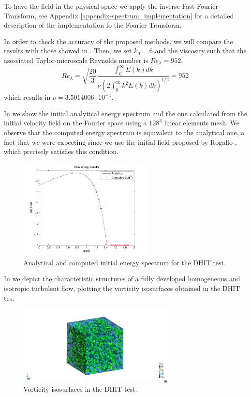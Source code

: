 To have the field  in the physical space we apply the inverse Fast Fourier Transform, see Appendix \ref{appendix-spectrum_implementation} for a detailed description of the implementation fo the Fourier Transform.

In order to check the accuracy of the proposed methods, we will compare the results with those showed in \cite{_selection_????}. Then, we set $k_0=6$ and the viscosity such that the asossiated Taylor-microscale Reynolds number is $Re_\lambda=952$,
$$Re_\lambda=\sqrt{\frac{20}{3}}\frac{\int_0^\infty E(k)dk}{\nu\left(2\int_0^\infty k^2E(k)dk\right)^{1/2}}=952\,$$
which results in $\nu=3.5014006\cdot 10^{-4}$.

In  we show the initial analytical energy spectrum and the one calculated from the initial velocity field on the Fourier space  using a $128^3$ linear elements mesh. We observe that the computed energy spectrum is equivalent to the analytical one, a fact that we were expecting since we use the initial field proposed by Rogallo \cite{rogallo_numerical_1981}, which precisely satisfies this condition.
\begin{figure}[h!]
	\centering	
	\includegraphics[width=0.6\textwidth]{Figures/Chapter3/DHIT_initial_energy}
	\caption{Analytical and computed initial energy spectrum for the DHIT test.}
	\label{fig-DHIT_initial_spectrum}
\end{figure}

In  we depict the characteristic structures of a fully developed homogeneous and isotropic turbulent flow, plotting the vorticity isosurfaces obtained in the DHIT tes.
\begin{figure}[h!]
	\centering	
	\includegraphics[trim=18cm 3.3cm 14cm 3.2cm,clip=true,width=0.7\textwidth]{Figures/Chapter3/DHIT_isovorticity}
	\caption{Vorticity isosurfaces in the DHIT test.}
	\label{fig-DHIT_isovorticity}
\end{figure}

